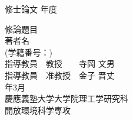 \pagestyle{empty}

{\LARGE 修士論文} \hspace{\fill} {\LARGE 年度}
\begin{center}
  \vspace{5cm}
  {\huge 修論題目}\\
  \vspace{2cm}
  {\Huge 著者名}\\
  {\LARGE (学籍番号：)}\\
  \vspace{3cm}
  {\LARGE 指導教員　教授　　寺岡 文男}\\
  {\LARGE 指導教員　准教授　金子 晋丈}\\
  \vspace{2cm}
  {\Large 年3月}\\
  \vspace{1cm}
  {\LARGE 慶應義塾大学大学院理工学研究科}\\
  {\LARGE 開放環境科学専攻} \\
\end{center}

\clearpage
\newpage